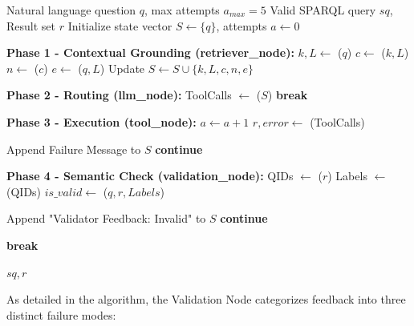 \begin{algorithm}[H]
\caption{Cyclic Agentic Text-to-SPARQL Workflow (LangGraph)}
\label{alg:agentic_workflow}
\begin{algorithmic}[1]
\Require Natural language question $q$, max attempts $a_{max} = 5$
\Ensure Valid SPARQL query $sq$, Result set $r$
\State Initialize state vector $S \gets \{q\}$, attempts $a \gets 0$

    \State \textbf{Phase 1 - Contextual Grounding (retriever\_node):}
     
        \State $k, L \gets$ ($q$)
        \State $c \gets$ ($k, L$)
        \State $n \gets$ ($c$) 
        \State $e \gets$ ($q, L$)
        \State Update $S \gets S \cup \{k, L, c, n, e\}$
    \EndIf

    \State \textbf{Phase 2 - Routing (llm\_node):}
    \State ToolCalls $\gets$ ($S$)
        \State \textbf{break} 
    \EndIf
    
    \State \textbf{Phase 3 - Execution (tool\_node):}
    \State $a \gets a + 1$
    \State $r, error \gets$ (ToolCalls)
    
        \State Append Failure Message to $S$
        \State \textbf{continue} 
    \EndIf
    
    \State \textbf{Phase 4 - Semantic Check (validation\_node):}
    \State QIDs $\gets$ ($r$)
    \State Labels $\gets$ (QIDs)
    \State $is\_valid \gets$ ($q, r, Labels$)
    
        \State Append "Validator Feedback: Invalid" to $S$
        \State \textbf{continue} 
    \EndIf
    
    \State \textbf{break} 
\EndWhile

\Return $sq, r$
\end{algorithmic}
\end{algorithm}

As detailed in the algorithm, the Validation Node categorizes feedback into three distinct failure modes:

